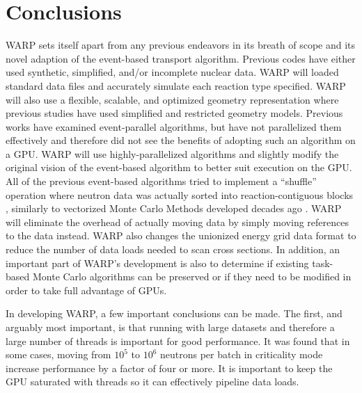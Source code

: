 \section{Conclusions}

WARP sets itself apart from any previous endeavors in its breath of scope and its novel adaption of the event-based transport algorithm.  Previous codes have either used synthetic, simplified, and/or incomplete nuclear data.  WARP will loaded standard data files and accurately simulate each reaction type specified.  WARP will also use a flexible, scalable, and optimized geometry representation where previous studies have used simplified and restricted geometry models.  Previous works have examined event-parallel algorithms, but have not parallelized them effectively and therefore did not see the benefits of adopting such an algorithm on a GPU.  WARP will use highly-parallelized algorithms and slightly modify the original vision of the event-based algorithm to better suit execution on the GPU.  All of the previous event-based algorithms tried to implement a ``shuffle'' operation where neutron data was actually sorted into reaction-contiguous blocks \cite{nelson,tianyu_snamc}, similarly to vectorized Monte Carlo Methods developed decades ago \cite{vector,vujic_vector}.  WARP will eliminate the overhead of actually moving data by simply moving references to the data instead.  WARP also changes the unionized energy grid data format to reduce the number of data loads needed to scan cross sections.  In addition, an important part of WARP's development is also to determine if existing task-based Monte Carlo algorithms can be preserved or if they need to be modified in order to take full advantage of GPUs.

In developing WARP, a few important conclusions can be made.  The first, and arguably most important, is that running with large datasets and therefore a large number of threads is important for good performance.  It was found that in some cases, moving from $10^5$ to $10^6$ neutrons per batch in criticality mode increase performance by a factor of four or more.  It is important to keep the GPU saturated with threads so it can effectively pipeline data loads.  %

